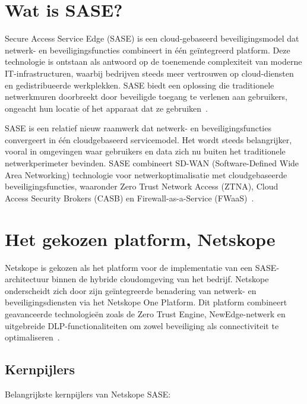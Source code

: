 \section{Wat is SASE?}
Secure Access Service Edge (SASE) is een cloud-gebaseerd beveiligingsmodel dat netwerk- en beveiligingsfuncties combineert in één geïntegreerd platform. Deze technologie is ontstaan als antwoord op de toenemende complexiteit van moderne IT-infrastructuren, waarbij bedrijven steeds meer vertrouwen op cloud-diensten en gedistribueerde werkplekken. SASE biedt een oplossing die traditionele netwerkmuren doorbreekt door beveiligde toegang te verlenen aan gebruikers, ongeacht hun locatie of het apparaat dat ze gebruiken~\autocite{KPN2023}.

SASE is een relatief nieuw raamwerk dat netwerk- en beveiligingsfuncties convergeert in één cloudgebaseerd servicemodel. Het wordt steeds belangrijker, vooral in omgevingen waar gebruikers en data zich nu buiten het traditionele netwerkperimeter bevinden. SASE combineert SD-WAN (Software-Defined Wide Area Networking) technologie voor netwerkoptimalisatie met cloudgebaseerde beveiligingsfuncties, waaronder Zero Trust Network Access (ZTNA), Cloud Access Security Brokers (CASB) en Firewall-as-a-Service (FWaaS)~\autocite{ZPE2025}.

\section{Het gekozen platform, Netskope}
Netskope is gekozen als het platform voor de implementatie van een SASE-architectuur binnen de hybride cloudomgeving van het bedrijf. Netskope onderscheidt zich door zijn geïntegreerde benadering van netwerk- en beveiligingsdiensten via het Netskope One Platform. Dit platform combineert geavanceerde technologieën zoals de Zero Trust Engine, NewEdge-netwerk en uitgebreide DLP-functionaliteiten om zowel beveiliging als connectiviteit te optimaliseren~\autocite{Netskope2025-1}.

\subsection{Kernpijlers}
Belangrijkste kernpijlers van Netskope SASE:

